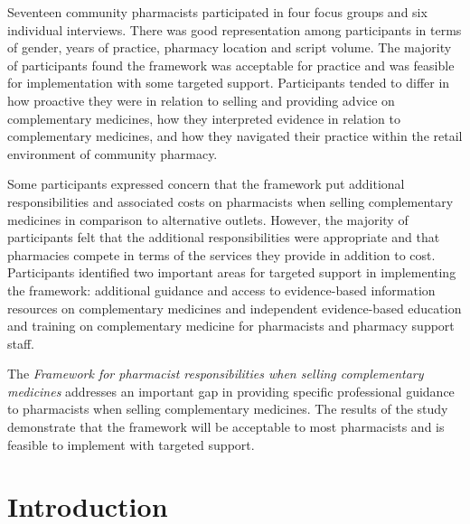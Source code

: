 \documentclass[12pt,]{article}
\begin{document}
Seventeen community pharmacists participated in four focus groups and
six individual interviews. There was good representation among
participants in terms of gender, years of practice, pharmacy location
and script volume. The majority of participants found the framework was
acceptable for practice and was feasible for implementation with some
targeted support. Participants tended to differ in how proactive they
were in relation to selling and providing advice on complementary
medicines, how they interpreted evidence in relation to complementary
medicines, and how they navigated their practice within the retail
environment of community pharmacy.

Some participants expressed concern that the framework put additional
responsibilities and associated costs on pharmacists when selling
complementary medicines in comparison to alternative outlets. However,
the majority of participants felt that the additional responsibilities
were appropriate and that pharmacies compete in terms of the services
they provide in addition to cost. Participants identified two important
areas for targeted support in implementing the framework: additional
guidance and access to evidence-based information resources on
complementary medicines and independent evidence-based education and
training on complementary medicine for pharmacists and pharmacy support
staff.

The \emph{Framework for pharmacist responsibilities when selling
complementary medicines} addresses an important gap in providing
specific professional guidance to pharmacists when selling complementary
medicines. The results of the study demonstrate that the framework will
be acceptable to most pharmacists and is feasible to implement with
targeted support.

\newpage 

\tableofcontents

\newpage

\newpage

\section{Introduction}\label{introduction}
\end{document}
